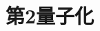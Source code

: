 \documentclass{report}
\begin{document}
  \maketitle
  \tableofcontents
  \section{第2量子化}
\end{document}
